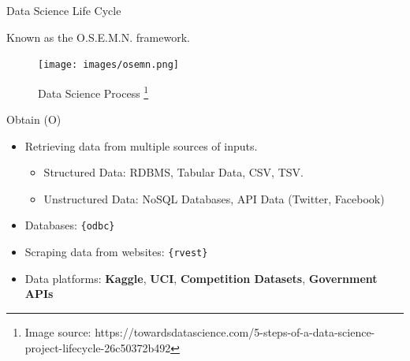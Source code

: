 \documentclass[12pt,ignorenonframetext,]{beamer}
\providecommand{\tightlist}{%
  \setlength{\itemsep}{0pt}\setlength{\parskip}{0pt}}
\begin{document}
\begin{frame}{Data Science Life Cycle}
\protect\hypertarget{data-science-life-cycle}{}

Known as the O.S.E.M.N. framework.

\begin{figure}
  \texttt{[image: images/osemn.png]}
  \caption{Data Science Process%
    \footnote{%
     \tiny{Image source: https://towardsdatascience.com/5-steps-of-a-data-science-project-lifecycle-26c50372b492} 
    }%
  }
\end{figure}

\end{frame}

\begin{frame}{Obtain (O)}
\protect\hypertarget{obtain-o}{}

\begin{itemize}
\tightlist
\item
  Retrieving data from multiple sources of inputs.\\

  \begin{itemize}
      \item Structured Data: RDBMS, Tabular Data, CSV, TSV.
      \item Unstructured Data: NoSQL Databases, API Data (Twitter, Facebook)
  \end{itemize}
   \vspace{2mm}
\item
  Databases: \texttt{\{odbc\}} \vspace{2mm}
\item
  Scraping data from websites: \texttt{\{rvest\}} \vspace{2mm}
\item
  Data platforms: \textbf{Kaggle}, \textbf{UCI}, \textbf{Competition
  Datasets}, \textbf{Government APIs}
\end{itemize}

\end{frame}
\end{document}
